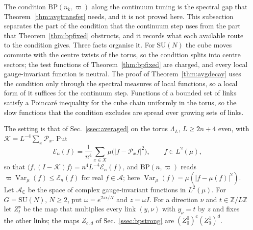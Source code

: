 \documentclass[aps,prd,twocolumn,superscriptaddress,nofootinbib,longbibliography,floatfix,amsmath,amssymb,10pt]{revtex4-2}
\theoremstyle{definition}
\theoremstyle{remark}
\newcommand{\Z}{\mathbb{Z}}
\newcommand{\C}{\mathbb{C}}
\newcommand{\SU}{\mathrm{SU}}
\newcommand{\Var}{\operatorname{Var}}
\newcommand{\ip}[2]{\langle #1,#2\rangle}
\begin{document}
The condition $\mathrm{BP}(n_k,\varpi)$ along the continuum tuning is the
spectral gap that Theorem~\ref{thm:avgtransfer} needs, and it is not proved
here. This subsection separates the part of the condition that the continuum
step uses from the part that Theorem~\ref{thm:bpfixed} obstructs, and it
records what each available route to the condition gives. Three facts
organise it. For $\SU(N)$ the cube moves commute with the centre twists of
the torus, so the condition splits into centre sectors; the test functions of
Theorem~\ref{thm:bpfixed} are charged, and every local gauge-invariant
function is neutral. The proof of Theorem~\ref{thm:avgdecay} uses the
condition only through the spectral measures of local functions, so a local
form of it suffices for the continuum step. Functions of a bounded set of
links satisfy a Poincar\'e inequality for the cube chain uniformly in the
torus, so the slow functions that the condition excludes are spread over
growing sets of links.

The setting is that of Sec.~\ref{ssec:averaged} on the torus $\Lambda_L$,
$L\ge2n+4$ even, with $\mathcal K=L^{-4}\sum_x\mathcal P_x$. Put
\[
\mathcal E_n(f)=\frac1{n^4}\sum_{x\in X}\mu\bigl(\lvert f-\mathcal P_xf
\rvert^2\bigr),\qquad f\in L^2(\mu),
\]
so that $\ip f{(I-\mathcal K)f}=n^4L^{-4}\mathcal E_n(f)$, and
$\mathrm{BP}(n,\varpi)$ reads $\varpi\Var_\mu(f)\le\mathcal E_n(f)$ for real
$f\in\mathcal A$; here $\Var_\mu(f)=\mu(\lvert f-\mu(f)\rvert^2)$. Let
$\mathcal A_\C$ be the space of complex gauge-invariant functions in
$L^2(\mu)$. For $G=\SU(N)$, $N\ge2$, put $\omega=e^{2\pi i/N}$ and $z=\omega
I$. For a direction $\nu$ and $t\in\Z/L\Z$ let $Z^\nu_t$ be the map that
multiplies every link $(y,\nu)$ with $y_\nu=t$ by $z$ and fixes the other
links; the maps $Z_{c,d}$ of Sec.~\ref{ssec:bpstrong} are $(Z^0_0)^c
(Z^1_0)^d$.
\end{document}
